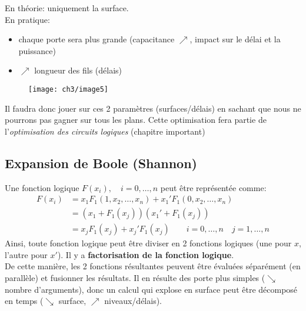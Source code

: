 En théorie: uniquement la surface.\\
En pratique:
\begin{itemize}
	\item chaque porte sera plus grande (capacitance $\nearrow$, impact sur le délai et la puissance)
	\item $\nearrow$ longueur des fils (délais)
\end{itemize}
\begin{figure}[H]
	\centering
	\texttt{[image: ch3/image5]}
\end{figure}
Il faudra donc jouer sur ces 2 paramètres (surfaces/délais) en sachant que nous ne pourrons pas gagner sur tous les plans. Cette optimisation fera partie de l'\textit{optimisation des circuits logiques} (chapitre important)
\subsection{Expansion de Boole (Shannon)}
Une fonction logique $F(x_i),\quad i=0,\dots,n$ peut être représentée comme:
\begin{align}
	F(x_i) &= x_1F_1(1,x_2,\dots,x_n)+x_1'F_1(0,x_2,\dots,x_n)\\
	&= (x_1+F_1(x_j))(x_1'+F_1(x_j))\\
	&= x_jF_1(x_j)+x_j'F_1(x_j)\qquad i=0,\dots,n\quad j=1,\dots,n
\end{align}
Ainsi, toute fonction logique peut être diviser en 2 fonctions logiques (une pour $x$, l'autre pour $x'$). Il y a \textbf{factorisation de la fonction logique}.\\

De cette manière, les 2 fonctions résultantes peuvent être évaluées séparément (en parallèle) et fusionner les résultats. Il en résulte des porte plus simples ($\searrow$ nombre d'arguments), donc un calcul qui explose en surface peut être décomposé en temps ($\searrow$ surface, $\nearrow$ niveaux/délais).